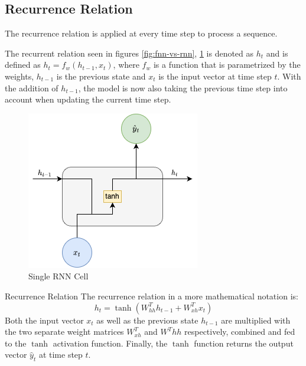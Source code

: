         \subsection{Recurrence Relation}
        \label{sec:recurrence-relation-background}

            The recurrence relation is applied at every time step to process a sequence.

            The recurrent relation seen in figures \ref{fig:fnn-vs-rnn}, \ref{fig:single-rnn-cell} is denoted as $h_t$ and is defined as $h_t = f_w(h_{t - 1}, x_t)$, where $f_w$ is a function that is parametrized by the weights, $h_{t-1}$ is the previous state and $x_t$ is the input vector at time step $t$. With the addition of $h_{t-1}$, the model is now also taking the previous time step into account when updating the current time step. 
            \begin{figure}[h!]
                \centering
                \includegraphics[scale=0.5]{figures/single_rnn_cell.drawio.png}
                \caption{Single RNN Cell}
                \label{fig:single-rnn-cell}
            \end{figure}

            
            \begin{pabox}{Recurrence Relation}
                \label{def:lstm-recurrence-relation-definition}
                The recurrence relation in a more mathematical notation is:
                $$h_t = \tanh(W^T_{hh} h_{t-1} + W^T_{xh} x_t)$$
                Both the input vector $x_t$ as well as the previous state $h_{t-1}$ are multiplied with the two separate weight matrices $W^T_{xh}$ and $W^T{hh}$ respectively, combined and fed to the $\tanh$ activation function. Finally, the $\tanh$ function returns the output vector $\hat{y}_t$ at time step $t$.
            \end{pabox}
            

